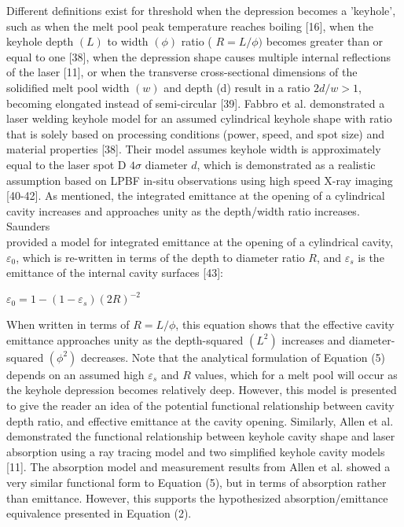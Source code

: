 \documentclass[10pt]{article}
\begin{document}
Different definitions exist for threshold when the depression becomes a 'keyhole', such as when the melt pool peak temperature reaches boiling [16], when the keyhole depth $(L)$ to width $(\phi)$ ratio ( $R=L / \phi)$ becomes greater than or equal to one [38], when the depression shape causes multiple internal reflections of the laser [11], or when the transverse cross-sectional dimensions of the solidified melt pool width $(w)$ and depth (d) result in a ratio $2 d / w>1$, becoming elongated instead of semi-circular [39]. Fabbro et al. demonstrated a laser welding keyhole model for an assumed cylindrical keyhole shape with ratio that is solely based on processing conditions (power, speed, and spot size) and material properties [38]. Their model assumes keyhole width is approximately equal to the laser spot D $4 \sigma$ diameter $d$, which is demonstrated as a realistic assumption based on LPBF in-situ observations using high speed X-ray imaging [40-42]. As mentioned, the integrated emittance at the opening of a cylindrical cavity increases and approaches unity as the depth/width ratio increases. Saunders\\
provided a model for integrated emittance at the opening of a cylindrical cavity, $\varepsilon_{0}$, which is re-written in terms of the depth to diameter ratio $R$, and $\varepsilon_{s}$ is the emittance of the internal cavity surfaces [43]:

$\varepsilon_{0}=1-\left(1-\varepsilon_{s}\right)(2 R)^{-2}$

When written in terms of $R=L / \phi$, this equation shows that the effective cavity emittance approaches unity as the depth-squared $\left(L^{2}\right)$ increases and diameter-squared $\left(\phi^{2}\right)$ decreases. Note that the analytical formulation of Equation (5) depends on an assumed high $\varepsilon_{s}$ and $R$ values, which for a melt pool will occur as the keyhole depression becomes relatively deep. However, this model is presented to give the reader an idea of the potential functional relationship between cavity depth ratio, and effective emittance at the cavity opening. Similarly, Allen et al. demonstrated the functional relationship between keyhole cavity shape and laser absorption using a ray tracing model and two simplified keyhole cavity models [11]. The absorption model and measurement results from Allen et al. showed a very similar functional form to Equation (5), but in terms of absorption rather than emittance. However, this supports the hypothesized absorption/emittance equivalence presented in Equation (2).
\end{document}
